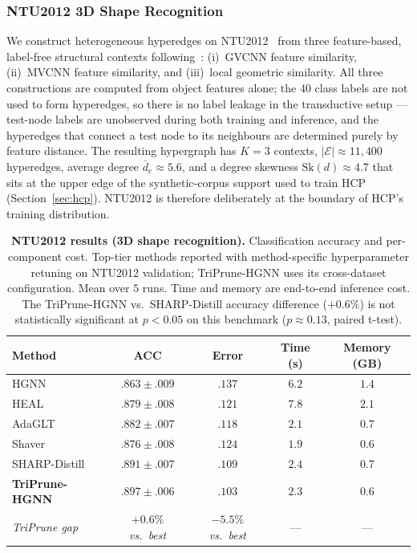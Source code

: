 \documentclass[10pt]{article}
\theoremstyle{plain}
\theoremstyle{definition}
\begin{document}
\subsubsection{NTU2012 3D Shape Recognition}
\label{sec:ntu2012}

We construct heterogeneous hyperedges on NTU2012~\citep{chen2003visual} from three feature-based, label-free structural contexts following~\citet{feng2019hypergraph}: (i)~GVCNN feature similarity, (ii)~MVCNN feature similarity, and (iii)~local geometric similarity. All three constructions are computed from object features alone; the 40 class labels are not used to form hyperedges, so there is no label leakage in the transductive setup --- test-node labels are unobserved during both training and inference, and the hyperedges that connect a test node to its neighbours are determined purely by feature distance. The resulting hypergraph has $K\!=\!3$ contexts, $|\mathcal{E}|\!\approx\!11{,}400$ hyperedges, average degree $\bar{d}_{e}\!\approx\!5.6$, and a degree skewness $\mathrm{Sk}(d)\!\approx\!4.7$ that sits at the upper edge of the synthetic-corpus support used to train HCP (Section~\ref{sec:hcp}). NTU2012 is therefore deliberately at the boundary of HCP's training distribution.

\begin{table}[ht!]
\centering
\caption{\textbf{NTU2012 results (3D shape recognition).} Classification accuracy and per-component cost. Top-tier methods reported with method-specific hyperparameter retuning on NTU2012 validation; TriPrune-HGNN uses its cross-dataset configuration. Mean over $5$ runs. Time and memory are end-to-end inference cost. The TriPrune-HGNN vs.\ SHARP-Distill accuracy difference ($+0.6\%$) is not statistically significant at $p\!<\!0.05$ on this benchmark ($p\!\approx\!0.13$, paired t-test).}
\label{tab:ntu2012}
\setlength{\tabcolsep}{6pt}
\renewcommand{\arraystretch}{1.1}
\small
\begin{tabular}{l cccc}
\toprule
\textbf{Method} & \textbf{ACC} & \textbf{Error} & \textbf{Time (s)} & \textbf{Memory (GB)} \\
\midrule
HGNN            & $.863\!\pm\!.009$ & $.137$ & $6.2$ & $1.4$ \\
HEAL            & $.879\!\pm\!.008$ & $.121$ & $7.8$ & $2.1$ \\
AdaGLT          & $.882\!\pm\!.007$ & $.118$ & $2.1$ & $0.7$ \\
Shaver          & $.876\!\pm\!.008$ & $.124$ & $1.9$ & $0.6$ \\
SHARP-Distill   & $.891\!\pm\!.007$ & $.109$ & $2.4$ & $0.7$ \\
\rowcolor{blue!10}
\textbf{TriPrune-HGNN} & $\mathbf{.897\!\pm\!.006}$ & $\mathbf{.103}$ & $2.3$ & $0.6$ \\
\midrule
\textit{TriPrune gap} & \textit{$+0.6\%$ vs.\ best} & \textit{$-5.5\%$ vs.\ best} & --- & --- \\
\bottomrule
\end{tabular}
\end{table}
\end{document}
